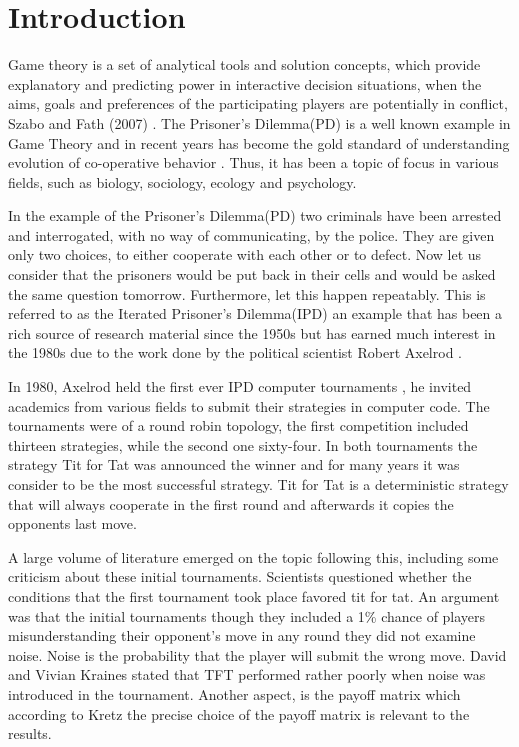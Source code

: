 \chapter{Introduction}

Game theory is a set of analytical tools and solution concepts, which provide
explanatory and predicting power in interactive decision situations, when the
aims, goals and preferences of the participating players are potentially in
conflict, Szabo and Fath (2007) \cite{Szabo2007}. The Prisoner's Dilemma(PD) is a well
known example in Game Theory and in recent years has become the gold standard of
understanding evolution of co-operative behavior \cite{Lorberbaum1994}.
Thus, it has been a topic of focus in various fields, such as biology,
sociology, ecology and psychology. %

In the example of the Prisoner's Dilemma(PD) two criminals have been arrested
and interrogated, with no way of communicating, by the police. They are given
only two choices, to either cooperate with each other or to defect.  Now let us
consider that the prisoners would be put back in their cells and would be asked
the same question tomorrow. Furthermore, let this happen repeatably. This is
referred to as the Iterated Prisoner's Dilemma(IPD) an example that has been a
rich source of research material since the 1950s but has earned much interest in
the 1980s due to the work done by the political scientist Robert Axelrod
\cite{Axelrod1980a, Axelrod1980b, Axelrod1981}.

In 1980, Axelrod held the first ever IPD computer tournaments \cite{Axelrod1980a,
Axelrod1980b}, he invited
academics from various fields to submit their strategies in computer code. The
tournaments were of a round robin topology, the first competition included thirteen
strategies, while the second one sixty-four. In both tournaments the strategy Tit
for Tat was announced the winner and for many years it  was consider to be the
most successful strategy. Tit for Tat is a deterministic strategy that will
always cooperate in the first round and afterwards it copies the opponents last
move.

A large volume of literature emerged on the topic following this, including some
criticism about these initial tournaments. Scientists questioned whether the
conditions that the first tournament took place favored tit for tat.
An argument was that the initial tournaments though they included
a 1\% chance of players misunderstanding their opponent's move in any round
they did not examine noise. Noise is the probability
that the player will submit the wrong move. David and Vivian Kraines \cite{kraines-1989a}
stated that TFT performed rather poorly when noise was introduced in the tournament.
Another aspect, is the payoff matrix which according to Kretz \cite{Kretz2011}
the precise choice of the payoff matrix is relevant to the results.

